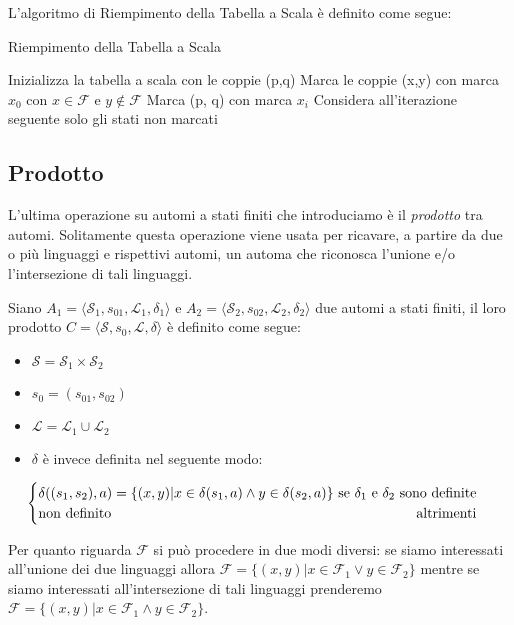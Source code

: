 L'algoritmo di Riempimento della Tabella a Scala è definito come segue:
\begin{algorithm}
    \caption{Riempimento della Tabella a Scala}\label{alg:Minimization_Algorithm}
    \begin{algorithmic}
        \State Inizializza la tabella a scala con le coppie (p,q)
        \State Marca le coppie (x,y) con marca $x_0$ con $x \in \mathcal{F}$ e $y \notin \mathcal{F}$
        \State Marca (p, q) con marca $x_i$
        \EndIf
        \State Considera all'iterazione seguente solo gli stati non marcati
        \EndWhile
    \end{algorithmic}
\end{algorithm}

\subsection{Prodotto}
L'ultima operazione su automi a stati finiti che introduciamo è il \emph{prodotto} tra automi. Solitamente questa operazione viene usata per ricavare, a partire da due o più linguaggi e rispettivi automi, un automa che riconosca l'unione e/o l'intersezione di tali linguaggi.
\begin{definition}
    \label{def:FSA_Product}
    Siano $A_1 = \langle \mathcal{S}_1, s_{01}, \mathcal{L}_1, \delta_1 \rangle$ e $A_2 = \langle \mathcal{S}_2, s_{02}, \mathcal{L}_2, \delta_2 \rangle$ due automi a stati finiti, il loro prodotto $C = \langle \mathcal{S}, s_0, \mathcal{L}, \delta \rangle$ è definito come segue:
    \begin{itemize}
        \item   $\mathcal{S} = \mathcal{S}_1 \times \mathcal{S}_2$
        \item $s_0 = (s_{01}, s_{02})$
        \item $\mathcal{L} = \mathcal{L}_1 \cup \mathcal{L}_2$
        \item $\delta$ è invece definita nel seguente modo:
    \end{itemize}
    \begin{equation*}
        \begin{cases}
            \text{$\delta ((s_1, s_2), a) = \{ (x,y) | x \in \delta(s_1, a) \land y \in \delta(s_2, a) \}$ \hfill se $\delta_1$ e $\delta_2$ sono definite} \\
            \text{non definito} \hfill \text{altrimenti}
        \end{cases}
    \end{equation*}
\end{definition}
\begin{remark}
    Per quanto riguarda $\mathcal{F}$ si può procedere in due modi diversi: se siamo interessati all'unione dei due linguaggi allora $\mathcal{F} = \{(x,y) | x \in \mathcal{F}_1 \lor y \in \mathcal{F}_2 \} $ mentre se siamo interessati all'intersezione di tali linguaggi prenderemo $\mathcal{F} = \{(x,y) | x \in \mathcal{F}_1 \land y \in \mathcal{F}_2 \}$.
\end{remark}

